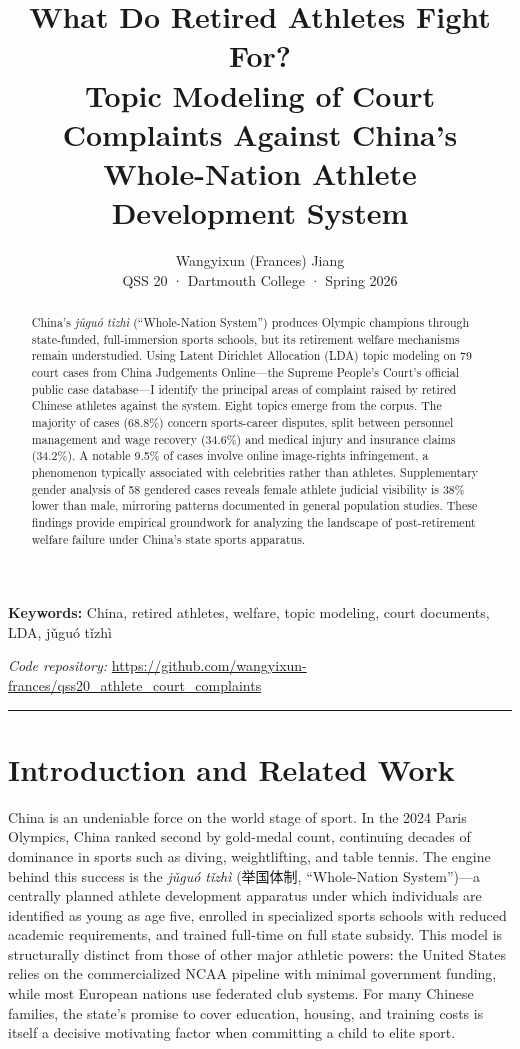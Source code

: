 \documentclass[10pt,letterpaper]{article}
\title{\textbf{What Do Retired Athletes Fight For?\\
Topic Modeling of Court Complaints Against China's\\
Whole-Nation Athlete Development System}}
\author{
  Wangyixun (Frances) Jiang\\
  \small QSS 20 · Dartmouth College · Spring 2026
}
\date{}
\begin{document}
\maketitle
\thispagestyle{empty}

\begin{abstract}
\noindent
China's \textit{jǔguó tǐzhì} (``Whole-Nation System'') produces Olympic champions through state-funded, full-immersion sports schools, but its retirement welfare mechanisms remain understudied. Using Latent Dirichlet Allocation (LDA) topic modeling on 79 court cases from China Judgements Online---the Supreme People's Court's official public case database---I identify the principal areas of complaint raised by retired Chinese athletes against the system. Eight topics emerge from the corpus. The majority of cases (68.8\%) concern sports-career disputes, split between personnel management and wage recovery (34.6\%) and medical injury and insurance claims (34.2\%). A notable 9.5\% of cases involve online image-rights infringement, a phenomenon typically associated with celebrities rather than athletes. Supplementary gender analysis of 58 gendered cases reveals female athlete judicial visibility is 38\% lower than male, mirroring patterns documented in general population studies. These findings provide empirical groundwork for analyzing the landscape of post-retirement welfare failure under China's state sports apparatus.
\end{abstract}

\noindent\textbf{Keywords:} China, retired athletes, welfare, topic modeling, court documents, LDA, jǔguó tǐzhì

\vspace{4pt}
\noindent\textit{Code repository:} \url{https://github.com/wangyixun-frances/qss20_athlete_court_complaints}

\hrule
\vspace{6pt}

\section{Introduction and Related Work}

China is an undeniable force on the world stage of sport. In the 2024 Paris Olympics, China ranked second by gold-medal count, continuing decades of dominance in sports such as diving, weightlifting, and table tennis. The engine behind this success is the \textit{jǔguó tǐzhì} (举国体制, ``Whole-Nation System'')---a centrally planned athlete development apparatus under which individuals are identified as young as age five, enrolled in specialized sports schools with reduced academic requirements, and trained full-time on full state subsidy. This model is structurally distinct from those of other major athletic powers: the United States relies on the commercialized NCAA pipeline with minimal government funding, while most European nations use federated club systems. For many Chinese families, the state's promise to cover education, housing, and training costs is itself a decisive motivating factor when committing a child to elite sport.
\end{document}

